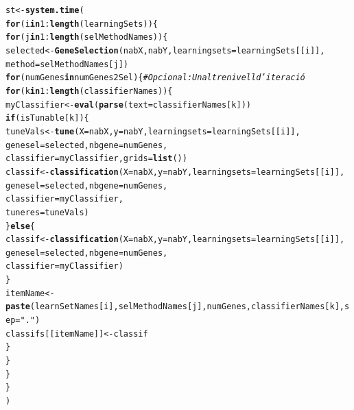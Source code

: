\documentclass{article}\usepackage[]{graphicx}\usepackage[]{color}
\makeatletter
\newcommand{\hlnum}[1]{\textcolor[rgb]{0.686,0.059,0.569}{#1}}%
\newcommand{\hlstr}[1]{\textcolor[rgb]{0.192,0.494,0.8}{#1}}%
\newcommand{\hlcom}[1]{\textcolor[rgb]{0.678,0.584,0.686}{\textit{#1}}}%
\newcommand{\hlopt}[1]{\textcolor[rgb]{0,0,0}{#1}}%
\newcommand{\hlstd}[1]{\textcolor[rgb]{0.345,0.345,0.345}{#1}}%
\newcommand{\hlkwa}[1]{\textcolor[rgb]{0.161,0.373,0.58}{\textbf{#1}}}%
\newcommand{\hlkwb}[1]{\textcolor[rgb]{0.69,0.353,0.396}{#1}}%
\newcommand{\hlkwc}[1]{\textcolor[rgb]{0.333,0.667,0.333}{#1}}%
\newcommand{\hlkwd}[1]{\textcolor[rgb]{0.737,0.353,0.396}{\textbf{#1}}}%
\newenvironment{kframe}{%
 \def\at@end@of@kframe{}%
 \ifinner\ifhmode%
  \def\at@end@of@kframe{\end{minipage}}%
  \begin{minipage}{\columnwidth}%
 \fi\fi%
 \def\FrameCommand##1{\hskip\@totalleftmargin \hskip-\fboxsep
 \colorbox{shadecolor}{##1}\hskip-\fboxsep
     \hskip-\linewidth \hskip-\@totalleftmargin \hskip\columnwidth}%
 \MakeFramed {\advance\hsize-\width
   \@totalleftmargin\z@ \linewidth\hsize
   \@setminipage}}%
 {\par\unskip\endMakeFramed%
 \at@end@of@kframe}
\newenvironment{knitrout}{}{} %
\makeatother
\begin{document}
\begin{knitrout}
\begin{kframe}
\begin{alltt}
\hlstd{st} \hlkwb{<-} \hlkwd{system.time}\hlstd{(}
\hlkwa{for} \hlstd{(i} \hlkwa{in} \hlnum{1}\hlopt{:}\hlkwd{length}\hlstd{(learningSets))\{}
  \hlkwa{for} \hlstd{(j} \hlkwa{in} \hlnum{1}\hlopt{:}\hlkwd{length}\hlstd{(selMethodNames))\{}
      \hlstd{selected}  \hlkwb{<-} \hlkwd{GeneSelection}\hlstd{(nabX, nabY,} \hlkwc{learningsets} \hlstd{= learningSets[[i]],}
                                 \hlkwc{method} \hlstd{= selMethodNames[j])}
      \hlkwa{for} \hlstd{(numGenes} \hlkwa{in} \hlstd{numGenes2Sel)\{} \hlcom{# Opcional : Un altre nivell d'iteració}
        \hlkwa{for} \hlstd{(k} \hlkwa{in} \hlnum{1}\hlopt{:}\hlkwd{length}\hlstd{(classifierNames))\{}
          \hlstd{myClassifier} \hlkwb{<-} \hlkwd{eval}\hlstd{(}\hlkwd{parse}\hlstd{(}\hlkwc{text}\hlstd{=classifierNames[k]))}
          \hlkwa{if}\hlstd{(isTunable[k])\{}
               \hlstd{tuneVals} \hlkwb{<-} \hlkwd{tune} \hlstd{(}\hlkwc{X}\hlstd{=nabX,} \hlkwc{y}\hlstd{=nabY,} \hlkwc{learningsets}\hlstd{= learningSets[[i]],}
                                 \hlkwc{genesel}\hlstd{=selected,} \hlkwc{nbgene}\hlstd{=numGenes,}
                                \hlkwc{classifier} \hlstd{=myClassifier,}  \hlkwc{grids}\hlstd{=}\hlkwd{list}\hlstd{())}
               \hlstd{classif} \hlkwb{<-} \hlkwd{classification}\hlstd{(}\hlkwc{X} \hlstd{= nabX,} \hlkwc{y}\hlstd{=nabY,} \hlkwc{learningsets} \hlstd{= learningSets[[i]],}
                                         \hlkwc{genesel}\hlstd{=selected,} \hlkwc{nbgene}\hlstd{=numGenes,}
                                         \hlkwc{classifier}\hlstd{=myClassifier,}
                                         \hlkwc{tuneres}\hlstd{=tuneVals)}
             \hlstd{\}}\hlkwa{else}\hlstd{\{}
               \hlstd{classif} \hlkwb{<-} \hlkwd{classification}\hlstd{(}\hlkwc{X} \hlstd{= nabX,} \hlkwc{y}\hlstd{=nabY,} \hlkwc{learningsets} \hlstd{= learningSets[[i]],}
                                         \hlkwc{genesel}\hlstd{=selected,} \hlkwc{nbgene}\hlstd{=numGenes,}
                                         \hlkwc{classifier}\hlstd{=myClassifier)}
             \hlstd{\}}
          \hlstd{itemName}\hlkwb{<-} \hlkwd{paste}\hlstd{(learnSetNames[i], selMethodNames[j], numGenes, classifierNames[k],} \hlkwc{sep}\hlstd{=}\hlstr{"."}\hlstd{)}
          \hlstd{classifs[[itemName]]}\hlkwb{<-} \hlstd{classif}
        \hlstd{\}}
      \hlstd{\}}
    \hlstd{\}}
\hlstd{\}}
\hlstd{)}
\end{alltt}


{\ttfamily\noindent\color{warningcolor}{\#\# Warning in tune(X, y = as.numeric(y) - 1, learningsets = learningsets, genesel = genesel, : Combination of feature selection and hyperparameter tuning\\\#\#\ \ \ \ \ \ \ \ \ \ \ \ \ \ \ \ is subject to pessimistic bias and will be fixed in a future\\\#\#\ \ \ \ \ \ \ \ \ \ \ \ \ \ \ \ package version.}}


\end{kframe}
\end{knitrout}
\end{document}
